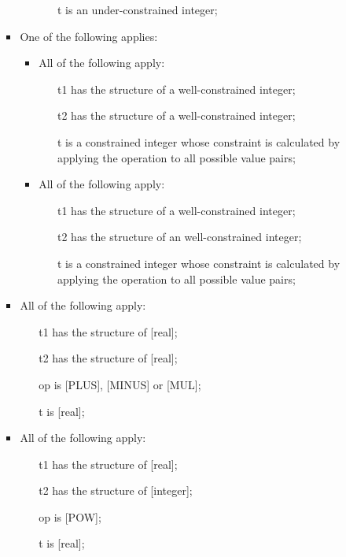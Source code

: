 \documentclass{book}
\begin{document}
\begin{itemize}
\begin{itemize}
\begin{itemize}
\begin{itemize}
\begin{itemize}
          \item  [t] is an under-constrained integer;
          \end{itemize}
       \end{itemize}
      \item  One of the following applies:
         \begin{itemize}
         \item  All of the following apply:
           \begin{itemize}
           \item  [t1] has the structure of a well-constrained integer;
           \item  [t2] has the structure of a well-constrained integer;
	   \item  [t] is a constrained integer whose constraint is calculated by
	     applying the operation to all possible value pairs;
           \end{itemize}
         \item  All of the following apply:
           \begin{itemize}
           \item  [t1] has the structure of a well-constrained integer;
           \item  [t2] has the structure of an well-constrained integer;
	   \item  [t] is a constrained integer whose constraint is calculated by
	     applying the operation to all possible value pairs;
           \end{itemize}
         \end{itemize}
      \item  All of the following apply:
        \begin{itemize}
        \item  [t1] has the structure of [real];
        \item  [t2] has the structure of [real];
        \item  [op] is [PLUS], [MINUS] or [MUL];
        \item  [t] is [real];
        \end{itemize}
     \item  All of the following apply:
       \begin{itemize}
       \item  [t1] has the structure of [real];
       \item  [t2] has the structure of [integer];
       \item  [op] is [POW];
       \item  [t] is [real];
       \end{itemize}
     \end{itemize}
   \end{itemize} 


\end{itemize}
\end{document}
